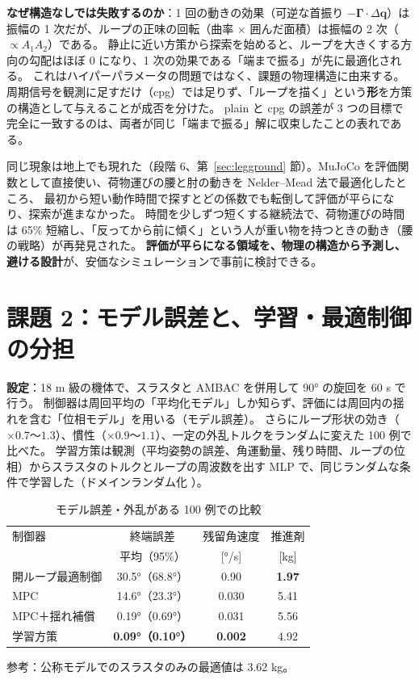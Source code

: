 \documentclass[paper=a4paper,fontsize=10pt,twocolumn,column_gap=2zw,line_length=24zw,number_of_lines=46,head_space=20mm]{jlreq}
\begin{document}
\textbf{なぜ構造なしでは失敗するのか}：1 回の動きの効果（可逆な首振り $-\bm\Gamma\cdot\Delta\bm q$）は振幅の 1 次だが、ループの正味の回転（曲率 × 囲んだ面積）は振幅の 2 次（$\propto A_1A_2$）である。
静止に近い方策から探索を始めると、ループを大きくする方向の勾配はほぼ 0 になり、1 次の効果である「端まで振る」が先に最適化される。
これはハイパーパラメータの問題ではなく、課題の物理構造に由来する。周期信号を観測に足すだけ（cpg）では足りず、「ループを描く」という\textbf{形}を方策の構造として与えることが成否を分けた。
plain と cpg の誤差が 3 つの目標で完全に一致するのは、両者が同じ「端まで振る」解に収束したことの表れである。

同じ現象は地上でも現れた（段階 6、第~\ref{sec:legground} 節）。MuJoCo \cite{todorov2012} を評価関数として直接使い、荷物運びの腰と肘の動きを Nelder--Mead 法で最適化したところ、
最初から短い動作時間で探すとどの係数でも転倒して評価が平らになり、探索が進まなかった。
時間を少しずつ短くする継続法で、荷物運びの時間は 65\% 短縮し、「反ってから前に傾く」という人が重い物を持つときの動き（腰の戦略）が再発見された。
\textbf{評価が平らになる領域を、物理の構造から予測し、避ける設計}が、安価なシミュレーションで事前に検討できる。


\section{課題 2：モデル誤差と、学習・最適制御の分担}\label{sec:robust}

\textbf{設定}：18 m 級の機体で、スラスタと AMBAC を併用して 90° の旋回を 60 s で行う。
制御器は周回平均の「平均化モデル」しか知らず、評価には周回内の揺れを含む「位相モデル」を用いる（モデル誤差）。
さらにループ形状の効き（$\times0.7$〜$1.3$）、慣性（$\times0.9$〜$1.1$）、一定の外乱トルクをランダムに変えた 100 例で比べた。
学習方策は観測（平均姿勢の誤差、角運動量、残り時間、ループの位相）からスラスタのトルクとループの周波数を出す MLP で、同じランダムな条件で学習した（ドメインランダム化 \cite{peng2018}）。

\begin{table}[t]\centering\small
\caption{モデル誤差・外乱がある 100 例での比較}\label{tab:robust}
\setlength{\tabcolsep}{4pt}\begin{tabular}{lccc}\toprule
制御器 & 終端誤差 & 残留角速度 & 推進剤 \\
 & 平均（95\%） & [°/s] & [kg] \\\midrule
開ループ最適制御 & 30.5°（68.8°） & 0.90 & \textbf{1.97} \\
MPC & 14.6°（23.3°） & 0.030 & 5.41 \\
MPC＋揺れ補償 & 0.19°（0.69°） & 0.031 & 5.56 \\
学習方策 & \textbf{0.09°（0.10°）} & \textbf{0.002} & 4.92 \\\bottomrule
\end{tabular}
\vspace{1pt}\par\footnotesize 参考：公称モデルでのスラスタのみの最適値は 3.62 kg。
\end{table}
\end{document}
